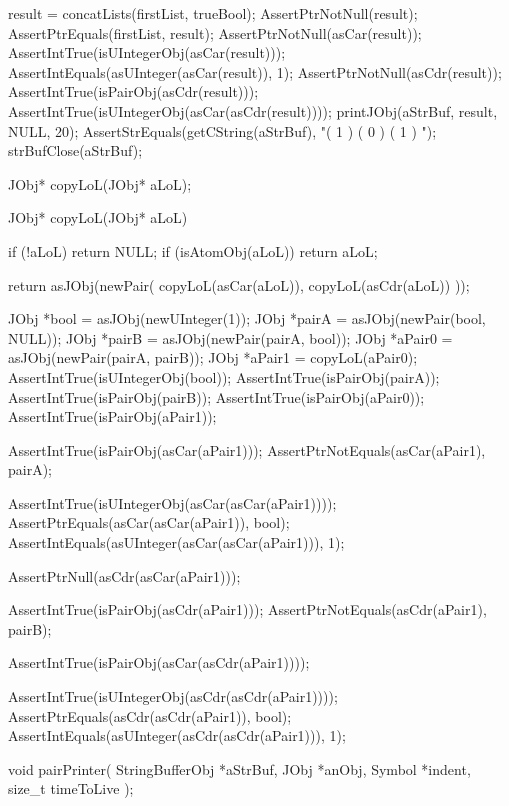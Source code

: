   result = concatLists(firstList, trueBool);
  AssertPtrNotNull(result);
  AssertPtrEquals(firstList, result);
  AssertPtrNotNull(asCar(result));
  AssertIntTrue(isUIntegerObj(asCar(result)));
  AssertIntEquals(asUInteger(asCar(result)), 1);
  AssertPtrNotNull(asCdr(result));
  AssertIntTrue(isPairObj(asCdr(result)));
  AssertIntTrue(isUIntegerObj(asCar(asCdr(result))));
  printJObj(aStrBuf, result, NULL, 20);
  AssertStrEquals(getCString(aStrBuf), "( 1 ) ( 0 ) ( 1 )  ");
  strBufClose(aStrBuf);
\stopCTest
\stopTestCase
\stopTestSuite

\startTestSuite[copyLoL]

\startCHeader
JObj* copyLoL(JObj* aLoL);
\stopCHeader

\startCCode
JObj* copyLoL(JObj* aLoL) {
  if (!aLoL) return NULL;
  if (isAtomObj(aLoL)) return aLoL;

  return asJObj(newPair(
    copyLoL(asCar(aLoL)),
    copyLoL(asCdr(aLoL))
  ));
}
\stopCCode


\startCTest
  JObj *bool   = asJObj(newUInteger(1));
  JObj *pairA  = asJObj(newPair(bool, NULL));
  JObj *pairB  = asJObj(newPair(pairA, bool));
  JObj *aPair0 = asJObj(newPair(pairA, pairB));
  JObj *aPair1 = copyLoL(aPair0);
  AssertIntTrue(isUIntegerObj(bool));
  AssertIntTrue(isPairObj(pairA));
  AssertIntTrue(isPairObj(pairB));
  AssertIntTrue(isPairObj(aPair0));
  AssertIntTrue(isPairObj(aPair1));

  AssertIntTrue(isPairObj(asCar(aPair1)));
  AssertPtrNotEquals(asCar(aPair1), pairA);

  AssertIntTrue(isUIntegerObj(asCar(asCar(aPair1))));
  AssertPtrEquals(asCar(asCar(aPair1)), bool);
  AssertIntEquals(asUInteger(asCar(asCar(aPair1))), 1);

  AssertPtrNull(asCdr(asCar(aPair1)));

  AssertIntTrue(isPairObj(asCdr(aPair1)));
  AssertPtrNotEquals(asCdr(aPair1), pairB);

  AssertIntTrue(isPairObj(asCar(asCdr(aPair1))));

  AssertIntTrue(isUIntegerObj(asCdr(asCdr(aPair1))));
  AssertPtrEquals(asCdr(asCdr(aPair1)), bool);
  AssertIntEquals(asUInteger(asCdr(asCdr(aPair1))), 1);
\stopCTest
\stopTestCase
\stopTestSuite

\startTestSuite[pairPrinter]

\startCHeader
void pairPrinter(
  StringBufferObj *aStrBuf,
  JObj            *anObj,
  Symbol          *indent,
  size_t          timeToLive
);
\stopCHeader


